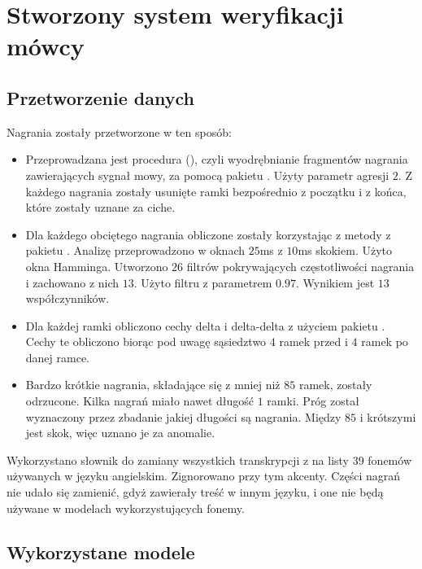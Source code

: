 \chapter{Stworzony system weryfikacji mówcy}\label{chap:badania}

\section{Przetworzenie danych}
\label{sec:data_wrangling}

Nagrania  zostały przetworzone w ten sposób:

\begin{itemize}
    \item Przeprowadzana jest procedura  (), czyli wyodrębnianie
        fragmentów nagrania zawierających sygnał mowy, za pomocą pakietu . Użyty parametr
        agresji $2$. Z każdego nagrania zostały usunięte ramki bezpośrednio z początku i z końca, które zostały
        uznane za ciche.
    \item Dla każdego obciętego nagrania obliczone zostały  korzystając z metody z
        pakietu . Analizę przeprowadzono w oknach $25$ms z $10$ms skokiem.
        Użyto okna Hamminga. Utworzono $26$ filtrów pokrywających częstotliwości nagrania i zachowano z nich
        $13$. Użyto filtru  z parametrem $0.97$. Wynikiem jest $13$ współczynników.
    \item Dla każdej ramki obliczono cechy delta i delta-delta z użyciem pakietu .
        Cechy te obliczono biorąc pod uwagę sąsiedztwo $4$ ramek przed i $4$ ramek po danej ramce.
    \item Bardzo krótkie nagrania, składające się z mniej niż $85$ ramek, zostały odrzucone. Kilka nagrań miało
        nawet długość $1$ ramki. Próg został wyznaczony przez zbadanie jakiej długości są nagrania. Między $85$
        i krótszymi jest skok, więc uznano je za anomalie.
\end{itemize}

Wykorzystano słownik  do zamiany wszystkich transkrypcji z  na listy 39 fonemów
używanych w języku angielskim. Zignorowano przy tym akcenty. Części nagrań nie udało się zamienić, gdyż
zawierały treść w innym języku, i one nie będą używane w modelach wykorzystujących fonemy.

\section{Wykorzystane modele}
\label{sec:data_models}

